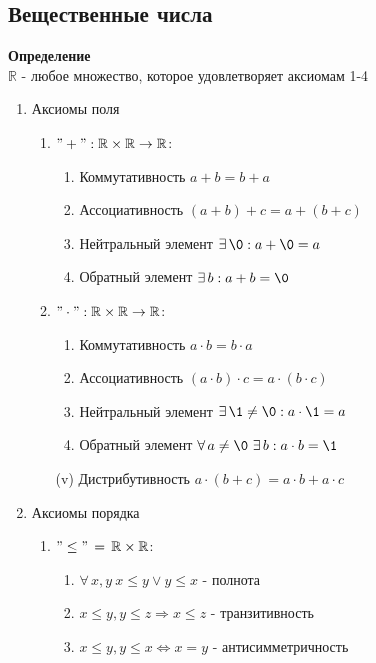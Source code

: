 \documentclass[12pt]{article}
\begin{document}
\subsection{Вещественные числа}
\textbf{Определение}\\
$\mathbb{R}$ - любое множество, которое удовлетворяет аксиомам 1-4
\begin{enumerate}
    \item Аксиомы поля
    \begin{enumerate}
        \item $"+": \mathbb{R}\times\mathbb{R} \rightarrow \mathbb{R}$:
        \begin{enumerate}
            \item Коммутативность $a+b=b+a$
            \item Ассоциативность $(a+b)+c=a+(b+c)$
            \item Нейтральный элемент $\exists\,\0: a+\0=a$
            \item Обратный элемент $\exists\,b: a+b=\0$
        \end{enumerate}
        \item $"\cdot": \mathbb{R}\times\mathbb{R} \rightarrow \mathbb{R}$:
        \begin{enumerate}
            \item Коммутативность $a\cdot b=b\cdot a$
            \item Ассоциативность $(a\cdot b)\cdot c=a\cdot(b\cdot c)$
            \item Нейтральный элемент $\exists\,\1\neq \0: a\cdot\1=a$
            \item Обратный элемент $\forall\,a \neq \0\ \exists\,b: a\cdot b=\1$
        \end{enumerate}
        \item[(v)] Дистрибутивность $a\cdot(b+c)=a\cdot b + a\cdot c$
    \end{enumerate}
    \item Аксиомы порядка
    \begin{enumerate}
        \item $"\leq"\,=\,\mathbb{R}\times\mathbb{R}$:
        \begin{enumerate}
            \item $\forall\,x,y\ x\leq y \lor y\leq x$ - полнота
            \item $x\leq y, y\leq z \Rightarrow x \leq z$ - транзитивность
            \item $x \leq y, y\leq x \Leftrightarrow x = y$ - антисимметричность

\end{enumerate}
\end{enumerate}
\end{enumerate}
\end{document}
